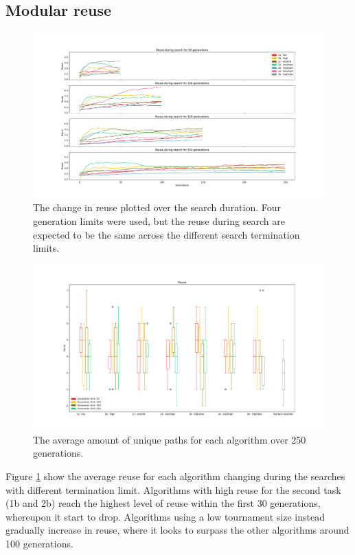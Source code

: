 \subsection{Modular reuse}
\begin{figure}
    \includegraphics[width=1.2\textwidth, center]{Chapters/4.Experiments/exp3/figures/reuse_progression.pdf}
    \caption[Module reuse during search]{The change in reuse plotted over the search duration. Four generation limits were used, but the reuse during search are expected to be the same across the different search termination limits.}
    \label{fig:exp3.reuseprogression}
\end{figure}
\begin{figure}[h]
    \includegraphics[width=1.25\textwidth, center]{Chapters/4.Experiments/exp3/figures/reuse_boxplot.pdf}
    \caption[Module reuse boxplot]{The average amount of unique paths for each algorithm over 250 generations.}
    \label{fig:exp3.reuseboxplot}
\end{figure}

Figure \ref{fig:exp3.reuseprogression} show the average reuse for each algorithm changing during the searches with different termination limit. Algorithms with high reuse for the second task (1b and 2b) reach the highest level of reuse within the first 30 generations, whereupon it start to drop. Algorithms using a low tournament size instead gradually increase in reuse, where it looks to surpass the other algorithms around 100 generations.  

